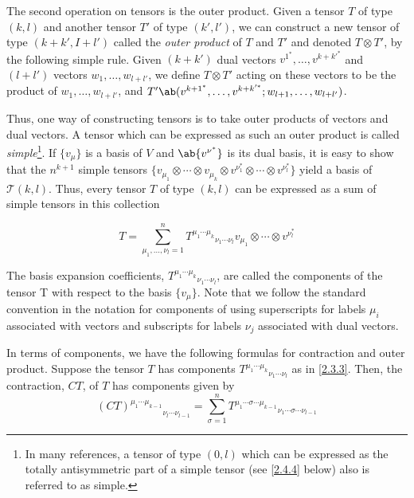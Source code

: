 The second operation on tensors is the outer product. Given a tensor $T$ of type $(k, l)$ and another tensor $T'$ of type $(k', l')$, we can construct a new tensor of type $(k+k', I+l')$ called the \emph{outer product} of $T$ and $T'$ and denoted $T\otimes T'$, by the following simple rule. Given $(k+k')$ dual vectors $v^{1^*},\ldots,v^{k+k'^*}$ and $(l+l')$ vectors $w_1,\ldots,w_{l+l'}$, we define $T\otimes T'$ acting on these vectors to be the product of $w_1,\ldots,w_{l+l'}$, and $T'\ab(v^{k+1^*},\ldots,v^{k+k'^*};w_{l+1},\ldots,w_{l+l'})$.

Thus, one way of constructing tensors is to take outer products of vectors and dual vectors. A tensor which can be expressed as such an outer product is called \emph{simple}\footnote{In many references, a tensor of type $(0,l)$ which can be expressed as the totally antisymmetric part of a simple tensor (see \eqref{2.4.4} below) also is referred to as simple.}. If $\{v_\mu\}$ is a basis of $V$ and $\ab\{v^{\nu^*}\}$ is its dual basis, it is easy to show that the $n^{k+1}$ simple tensors $\Big\{v_{\mu_1}\otimes\cdots\otimes v_{\mu_k}\otimes v^{\nu_1^*}\otimes\cdots\otimes v^{\nu_l^*}\Big\}$ yield a basis of $\mathscr{T}(k,l)$. Thus, every tensor $T$ of type $(k, l)$ can be expressed as a sum of simple tensors in this collection

\begin{equation}
    T=\sum_{\mu_1,\ldots,\nu_l=1}^n{T^{\mu_1\cdots\mu_k}}_{\nu_1\cdots\nu_l}v_{\mu_1}\otimes\cdots\otimes v^{\nu_l^*}
    \label{2.3.3}
\end{equation}

The basis expansion coefficients, ${T^{\mu_1\cdots\mu_k}}_{\nu_1\cdots\nu_l}$, are called the components of the tensor T with respect to the basis $\{v_\mu\}$. Note that we follow the standard convention in the notation for components of using superscripts for labels $\mu_i$ associated with vectors and subscripts for labels $\nu_j$ associated with dual vectors.

In terms of components, we have the following formulas for contraction and outer product. Suppose the tensor $T$ has components ${T^{\mu_1\cdots\mu_k}}_{\nu_1\cdots\nu_l}$ as in \eqref{2.3.3}. Then, the contraction, $CT$, of $T$ has components given by
\begin{equation}
    {(CT)^{\mu_1\cdots\mu_{k-1}}}_{\nu_l\cdots\nu_{l-1}}=\sum_{\sigma=1}^n{T^{\mu_1\cdots\sigma\cdots\mu_{k-1}}}_{\nu_1\cdots\sigma\cdots\nu_{l-1}}
    \label{2.3.4}
\end{equation}

